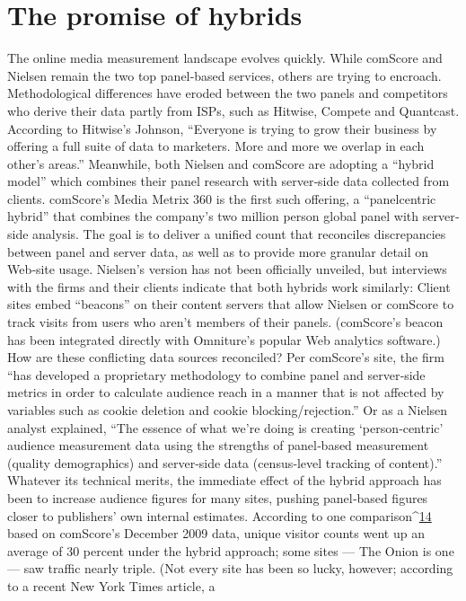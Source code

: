 \section{The promise of hybrids}
The online media measurement landscape evolves quickly. While
comScore and Nielsen remain the two top panel‐based services, others are
trying to encroach. Methodological differences have eroded between the
two panels and competitors who derive their data partly from ISPs, such
as Hitwise, Compete and Quantcast. According to Hitwise’s Johnson,
``Everyone is trying to grow their business by offering a full suite of data
to marketers. More and more we overlap in each other’s areas.''
Meanwhile, both Nielsen and comScore are adopting a ``hybrid model''
which combines their panel research with server‐side data collected from
clients. comScore’s Media Metrix 360 is the first such offering, a ``panelcentric
hybrid'' that combines the company’s two million person global
panel with server‐side analysis. The goal is to deliver a unified count that
reconciles discrepancies between panel and server data, as well as to
provide more granular detail on Web‐site usage.
Nielsen’s version has not been officially unveiled, but interviews with the
firms and their clients indicate that both hybrids work similarly: Client
sites embed ``beacons'' on their content servers that allow Nielsen or
comScore to track visits from users who aren’t members of their panels.
(comScore’s beacon has been integrated directly with Omniture’s popular
Web analytics software.)
How are these conflicting data sources reconciled? Per comScore’s site, the
firm ``has developed a proprietary methodology to combine panel and
server‐side metrics in order to calculate audience reach in a manner that is
not affected by variables such as cookie deletion and cookie
blocking/rejection.'' Or as a Nielsen analyst explained, ``The essence of
what we’re doing is creating ‘person‐centric’ audience measurement data
using the strengths of panel‐based measurement (quality demographics)
and server‐side data (census‐level tracking of content).''
Whatever its technical merits, the immediate effect of the hybrid approach
has been to increase audience figures for many sites, pushing panel‐based
figures closer to publishers’ own internal estimates. According to one
comparison^{\href{#endnotes}{14}} based on comScore’s December 2009 data, unique visitor
counts went up an average of 30 percent under the hybrid approach; some
sites — The Onion is one — saw traffic nearly triple. (Not every site has
been so lucky, however; according to a recent New York Times article, a
